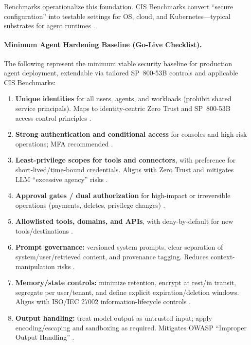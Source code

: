 \begin{TNtwocol}
      Benchmarks operationalize this foundation. CIS Benchmarks convert “secure configuration” into testable settings for OS, cloud, and Kubernetes—typical substrates for agent runtimes \cite{CIS_Benchmarks}.

      \paragraph{Minimum Agent Hardening Baseline (Go-Live Checklist).}
      The following represent the minimum viable security baseline for production agent deployment, extendable via tailored SP~800-53B controls and applicable CIS Benchmarks:

      \begin{enumerate}
            \item \textbf{Unique identities} for all users, agents, and workloads (prohibit shared service principals). Maps to identity-centric Zero Trust and SP~800-53B access control principles \cite{NIST_SP800_207, NIST_SP800_53B}.
            \item \textbf{Strong authentication and conditional access} for consoles and high-risk operations; MFA recommended \cite{NIST_SP800_207}.
            \item \textbf{Least-privilege scopes for tools and connectors}, with preference for short-lived/time-bound credentials. Aligns with Zero Trust and mitigates LLM “excessive agency” risks \cite{OWASP_LLM_Top10}.
            \item \textbf{Approval gates / dual authorization} for high-impact or irreversible operations (payments, deletes, privilege changes) \cite{OWASP_LLM_Top10}.
            \item \textbf{Allowlisted tools, domains, and APIs}, with deny-by-default for new tools/destinations \cite{NIST_SP800_207}.
            \item \textbf{Prompt governance:} versioned system prompts, clear separation of system/user/retrieved content, and provenance tagging. Reduces context-manipulation risks \cite{OWASP_Prompt_Injection_CS}.
            \item \textbf{Memory/state controls:} minimize retention, encrypt at rest/in transit, segregate per user/tenant, and define explicit expiration/deletion windows. Aligns with ISO/IEC 27002 information-lifecycle controls \cite{ISO_27002_2022}.
            \item \textbf{Output handling:} treat model output as untrusted input; apply encoding/escaping and sandboxing as required. Mitigates OWASP “Improper Output Handling” \cite{OWASP_LLM_Top10}.

\end{enumerate}
\end{TNtwocol}
